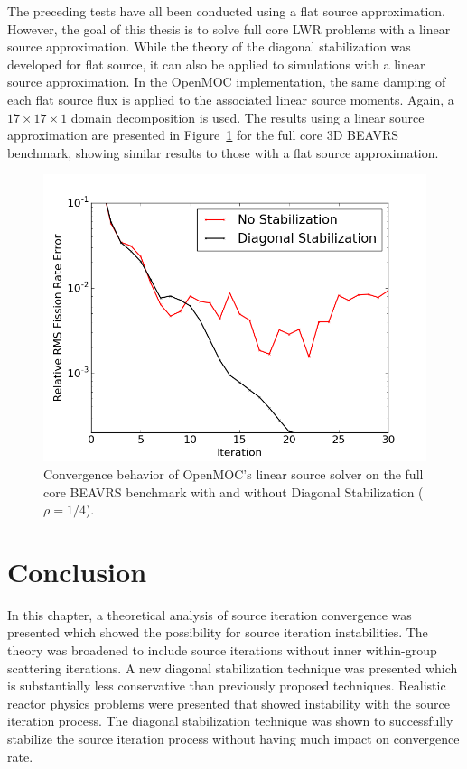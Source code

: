 The preceding tests have all been conducted using a flat source approximation. However, the goal of this thesis is to solve full core \ac{LWR} problems with a linear source approximation. While the theory of the diagonal stabilization was developed for flat source, it can also be applied to simulations with a linear source approximation. In the OpenMOC implementation, the same damping of each flat source flux is applied to the associated linear source moments. Again, a $17 \times 17 \times 1$ domain decomposition is used. The results using a linear source approximation are presented in Figure~\ref{fig:fc-3D-ls} for the full core 3D BEAVRS benchmark, showing similar results to those with a flat source approximation.

\begin{figure}[ht!]
	\centering
	\includegraphics[width=0.65\linewidth]{figures/convergence/full-core-3D-ls.png}
	\caption{Convergence behavior of OpenMOC's linear source solver on the full core \ac{BEAVRS} benchmark with and without Diagonal Stabilization ($\rho = 1/4$).}
	\label{fig:fc-3D-ls}
\end{figure}

\section{Conclusion}
\label{sec:convergence-conclusion}

In this chapter, a theoretical analysis of source iteration convergence was presented which showed the possibility for source iteration instabilities. The theory was broadened to include source iterations without inner within-group scattering iterations. A new diagonal stabilization technique was presented which is substantially less conservative than previously proposed techniques. Realistic reactor physics problems were presented that showed instability with the source iteration process. The diagonal stabilization technique was shown to successfully stabilize the source iteration process without having much impact on convergence rate.

